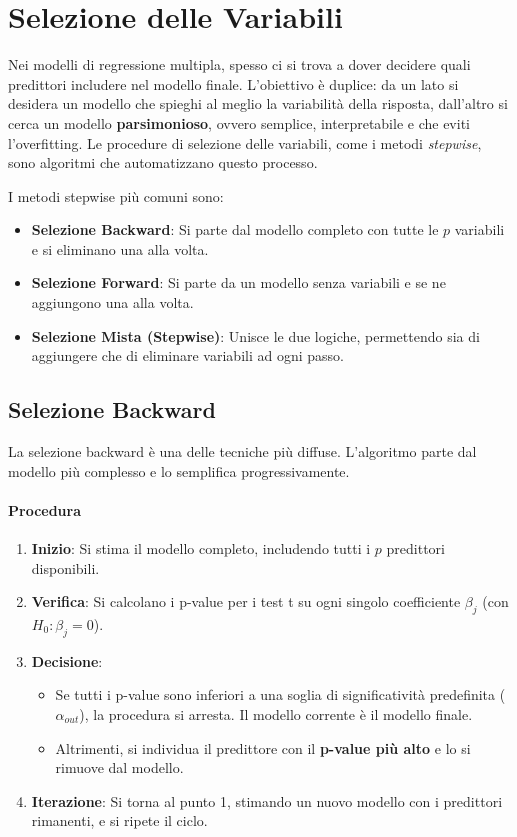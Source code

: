 \section{Selezione delle Variabili}

Nei modelli di regressione multipla, spesso ci si trova a dover decidere quali
predittori includere nel modello finale. L'obiettivo è duplice: da un lato si
desidera un modello che spieghi al meglio la variabilità della risposta,
dall'altro si cerca un modello \textbf{parsimonioso}, ovvero semplice,
interpretabile e che eviti l'overfitting. Le procedure di selezione delle
variabili, come i metodi \textit{stepwise}, sono algoritmi che automatizzano
questo processo.

I metodi stepwise più comuni sono:
\begin{itemize}
    \item \textbf{Selezione Backward}: Si parte dal modello completo con tutte
    le \(p\) variabili e si eliminano una alla volta.
    \item \textbf{Selezione Forward}: Si parte da un modello senza variabili e
    se ne aggiungono una alla volta.
    \item \textbf{Selezione Mista (Stepwise)}: Unisce le due logiche,
    permettendo sia di aggiungere che di eliminare variabili ad ogni passo.
\end{itemize}

\subsection{Selezione Backward}

La selezione backward è una delle tecniche più diffuse. L'algoritmo parte dal
modello più complesso e lo semplifica progressivamente.

\paragraph{Procedura}
\begin{enumerate}
    \item \textbf{Inizio}: Si stima il modello completo, includendo tutti i
    \(p\) predittori disponibili.
    \item \textbf{Verifica}: Si calcolano i p-value per i test t su ogni singolo
    coefficiente \(\beta_j\) (con \(H_0: \beta_j=0\)).
    \item \textbf{Decisione}:
    \begin{itemize}
        \item Se tutti i p-value sono inferiori a una soglia di significatività
        predefinita (\(\alpha_{out}\)), la procedura si arresta. Il modello
        corrente è il modello finale.
        \item Altrimenti, si individua il predittore con il \textbf{p-value più
        alto} e lo si rimuove dal modello.
    \end{itemize}
    \item \textbf{Iterazione}: Si torna al punto 1, stimando un nuovo modello
    con i predittori rimanenti, e si ripete il ciclo.
\end{enumerate}

